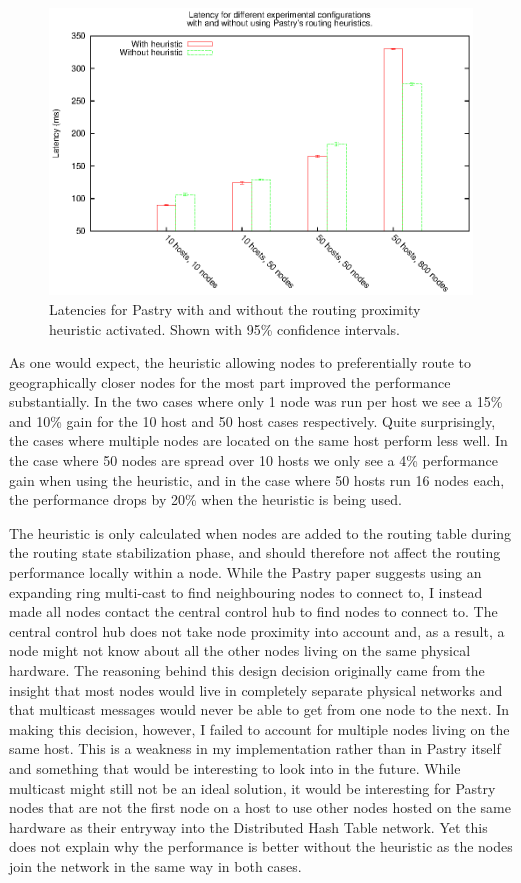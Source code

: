 \begin{figure}[!htb]
  \begin{center}
    \includegraphics[width=0.9\linewidth]{illustrations/pastry_heuristic.eps}
    \caption{Latencies for Pastry with and without the routing proximity heuristic activated. Shown with 95\% confidence intervals.}
    \label{figPastryHeuristic}
  \end{center}
\end{figure}

As one would expect, the heuristic allowing nodes to preferentially route to geographically closer nodes for the most part improved the performance substantially. In the two cases where only 1 node was run per host we see a 15\% and 10\% gain for the 10 host and 50 host cases respectively.
Quite surprisingly, the cases where multiple nodes are located on the same host perform less well. In the case where 50 nodes are spread over 10 hosts we only see a 4\% performance gain when using the heuristic, and in the case where 50 hosts run 16 nodes each, the performance drops by 20\% when the heuristic is being used.

The heuristic is only calculated when nodes are added to the routing table during the routing state stabilization phase, and should therefore not affect the routing performance locally within a node.
While the Pastry paper \cite{pastry} suggests using an expanding ring multi-cast to find neighbouring nodes to connect to, I instead made all nodes contact the central control hub to find nodes to connect to. The central control hub does not take node proximity into account and, as a result, a node might not know about all the other nodes living on the same physical hardware. The reasoning behind this design decision originally came from the insight that most nodes would live in completely separate physical networks and that multicast messages would never be able to get from one node to the next. In making this decision, however, I failed to account for multiple nodes living on the same host.
This is a weakness in my implementation rather than in Pastry itself and something that would be interesting to look into in the future. While multicast might still not be an ideal solution, it would be interesting for Pastry nodes that are not the first node on a host to use other nodes hosted on the same hardware as their entryway into the Distributed Hash Table network.
Yet this does not explain why the performance is better without the heuristic as the nodes join the network in the same way in both cases.

